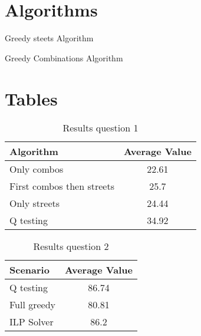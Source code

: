 \appendix
\section*{Algorithms}
 \begin{algorithm}[ht]
\SetAlgoLined
{}
\label{algo:streets}
 \caption{Greedy steets Algorithm}
\end{algorithm}


 \begin{algorithm}[ht]
\SetAlgoLined
{}
\label{algo:combinations}
 \caption{Greedy Combinations Algorithm}
\end{algorithm}

\section*{Tables}
\begin{table}
    \centering
    \begin{tabular}{|l|c|}
        \hline
        \textbf{Algorithm} & \textbf{Average Value} \\
        \hline
        Only combos & 22.61 \\
        First combos then streets & 25.7 \\
        Only streets & 24.44 \\
        Q testing & 34.92 \\
        \hline
    \end{tabular}
    \caption{Results question 1}
    \label{tab:average_values}
\end{table}

\begin{table}
    \centering
    \begin{tabular}{|l|c|}
        \hline
        \textbf{Scenario} & \textbf{Average Value} \\
        \hline
        Q testing & 86.74 \\
        Full greedy & 80.81 \\
        ILP Solver & 86.2 \\
        \hline
    \end{tabular}
    \caption{Results question 2}
    \label{tab:hyper}
\end{table}


